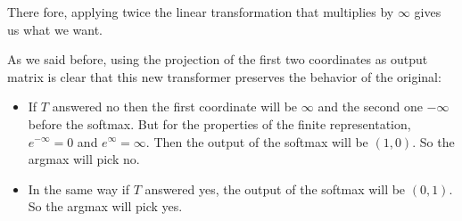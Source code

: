 There fore, applying twice the linear transformation that multiplies by $\infty$ gives us what we want.

As we said before, using the projection of the first two coordinates as output matrix is clear that this new transformer preserves the behavior of the original:

\begin{itemize}
    \item If $T$ answered no then the first coordinate will be $\infty$ and the second one $-\infty$ before the softmax. But for the properties of the finite representation, $e^{-\infty} = 0$ and $e^{\infty} = \infty$. Then the output of the softmax will be $(1,0)$. So the argmax will pick no.
    \item In the same way if $T$ answered yes, the output of the softmax will be $(0,1)$. So the argmax  will pick yes.
\end{itemize}

